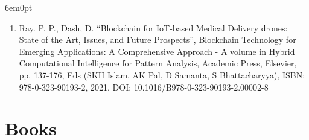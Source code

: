 \documentclass[11pt,a4paper]{moderncv}
\begin{document}
\begin{adjustwidth}{6em}{0pt}
\begin{enumerate}
		\item Ray. P. P., Dash, D. “Blockchain for IoT-based Medical Delivery drones: State of the Art, Issues, and Future Prospects”, Blockchain Technology for Emerging Applications: A Comprehensive Approach - A volume in Hybrid Computational Intelligence for Pattern Analysis, Academic Press, Elsevier, pp. 137-176, Eds (SKH Islam, AK Pal, D Samanta, S Bhattacharyya), ISBN:  978-0-323-90193-2, 2021, DOI: 10.1016/B978-0-323-90193-2.00002-8
		
		
	\end{enumerate}
\end{adjustwidth}






\section{\textbf{Books}}
\end{document}
